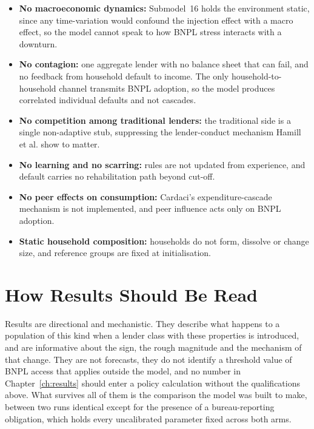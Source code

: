 \begin{itemize}
    \item \textbf{No macroeconomic dynamics:} Submodel~16 holds the environment static, since any
    time-variation would confound the injection effect with a macro effect, so the model cannot
    speak to how \ac{BNPL} stress interacts with a downturn.
    \item \textbf{No contagion:} one aggregate lender with no balance sheet that can fail, and no
    feedback from household default to income. The only household-to-household channel transmits
    \ac{BNPL} adoption, so the model produces correlated individual defaults and not cascades.
    \item \textbf{No competition among traditional lenders:} the traditional side is a single
    non-adaptive stub, suppressing the lender-conduct mechanism Hamill et al. show to matter.
    \item \textbf{No learning and no scarring:} rules are not updated from experience, and default
    carries no rehabilitation path beyond cut-off.
    \item \textbf{No peer effects on consumption:} Cardaci's expenditure-cascade mechanism is not
    implemented, and peer influence acts only on \ac{BNPL} adoption.
    \item \textbf{Static household composition:} households do not form, dissolve or change size,
    and reference groups are fixed at initialisation.
\end{itemize}

\section{How Results Should Be Read}
\label{sec:lim-reading}

Results are directional and mechanistic. They describe what happens to a population of this kind
when a lender class with these properties is introduced, and are informative about the sign, the
rough magnitude and the mechanism of that change. They are not forecasts, they do not identify a
threshold value of \ac{BNPL} access that applies outside the model, and no number in
Chapter~\ref{ch:results} should enter a policy calculation without the qualifications above. What
survives all of them is the comparison the model was built to make, between two runs identical
except for the presence of a bureau-reporting obligation, which holds every uncalibrated parameter
fixed across both arms.
